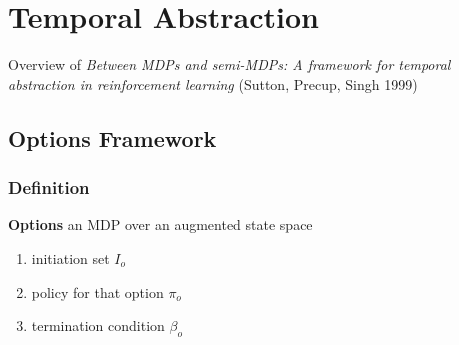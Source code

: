 \documentclass[]{article}
\theoremstyle{definition}
\begin{document}




\section{Temporal Abstraction}
\label{sec:temporal}
Overview of \textit{Between MDPs and semi-MDPs: A framework for temporal abstraction in reinforcement learning} (Sutton, Precup, Singh 1999)

\subsection{Options Framework}
\label{sub:options_framework}

\subsubsection{Definition}
\label{ssub:definition}
\textbf{Options} an MDP over an augmented state space
\begin{enumerate}
    \item initiation set $I_o$
    \item policy for that option $\pi_o$
    \item termination condition $\beta_o$
\end{enumerate}
\end{document}
